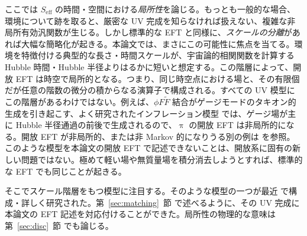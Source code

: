 \documentclass[a4paper,11pt]{ltjsarticle}
\numberwithin{equation}{section}
\newcommand{\Sec}[1]{Sec.~\ref{#1}}
\renewcommand{\Sec}[1]{第~\ref{#1}~節}
\begin{document}
ここでは $S_{\mathrm{eff}}$ の時間・空間における\textit{局所性}を論じる。もっとも一般的な場合、環境について跡を取ると、厳密な UV 完成を知らなければ扱えない、複雑な非局所有効汎関数が生じる。しかし標準的な EFT と同様に、\textit{スケールの分離}があれば大幅な簡略化が起きる。本論文では、まさにこの可能性に焦点を当てる。環境を特徴付ける典型的な長さ・時間スケールが、宇宙論的相関関数を計算する Hubble 時間・Hubble 半径よりはるかに短いと想定する。この階層によって、開放 EFT は時空で局所的となる。つまり、同じ時空点における場と、その有限個だが任意の階数の微分の積からなる演算子で構成される。すべての UV 模型にこの階層があるわけではない。例えば、$\phi F\tilde F$ 結合がゲージモードのタキオン的生成を引き起こす、よく研究されたインフレーション模型 \cite{Anber:2009ua} では、ゲージ場が主に Hubble 半径通過の前後で生成されるので、$\uppi$ の開放 EFT は非局所的になる。開放 EFT が非局所的、または非 Markov 的になりうる別の例は \cite{breuerColloquiumNonMarkovianDynamics2016,Prudhoe:2022pte,Shandera:2017qkg,Colas:2022hlq,Colas:2022kfu,Colas:2024xjy} を参照。このような模型を本論文の開放 EFT で記述できないことは、開放系に固有の新しい問題ではない。極めて軽い場や無質量場を積分消去しようとすれば、標準的な EFT でも同じことが起きる。

そこでスケール階層をもつ模型に注目する。そのような模型の一つが最近 \cite{Creminelli:2023aly} で構成・詳しく研究された。\Sec{sec:matching} で述べるように、その UV 完成に本論文の EFT 記述を対応付けることができた。局所性の物理的な意味は \Sec{sec:disc} でも論じる。
\end{document}
